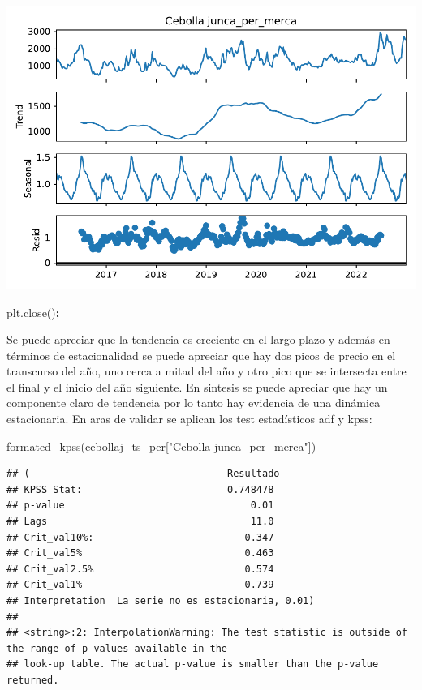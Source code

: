 \documentclass[
]{book}
\newenvironment{Shaded}{\begin{snugshade}}{\end{snugshade}}
\newcommand{\NormalTok}[1]{#1}
\newcommand{\OperatorTok}[1]{\textcolor[rgb]{0.81,0.36,0.00}{\textbf{#1}}}
\newcommand{\StringTok}[1]{\textcolor[rgb]{0.31,0.60,0.02}{#1}}
\begin{document}
\includegraphics{bookdown-demo_files/figure-latex/unnamed-chunk-98-77.pdf}

\begin{Shaded}
\begin{Highlighting}[]
\NormalTok{plt.close()}\OperatorTok{;}
\end{Highlighting}
\end{Shaded}

Se puede apreciar que la tendencia es creciente en el largo plazo y además en términos de estacionalidad se puede apreciar que hay dos picos de precio en el transcurso del año, uno cerca a mitad del año y otro pico que se intersecta entre el final y el inicio del año siguiente. En sintesis se puede apreciar que hay un componente claro de tendencia por lo tanto hay evidencia de una dinámica estacionaria. En aras de validar se aplican los test estadísticos adf y kpss:

\begin{Shaded}
\begin{Highlighting}[]

\NormalTok{formated\_kpss(cebollaj\_ts\_per[}\StringTok{"Cebolla junca\_per\_merca"}\NormalTok{])}
\end{Highlighting}
\end{Shaded}

\begin{verbatim}
## (                                  Resultado
## KPSS Stat:                         0.748478
## p-value                                0.01
## Lags                                   11.0
## Crit_val10%:                          0.347
## Crit_val5%                            0.463
## Crit_val2.5%                          0.574
## Crit_val1%                            0.739
## Interpretation  La serie no es estacionaria, 0.01)
## 
## <string>:2: InterpolationWarning: The test statistic is outside of the range of p-values available in the
## look-up table. The actual p-value is smaller than the p-value returned.
\end{verbatim}
\end{document}
